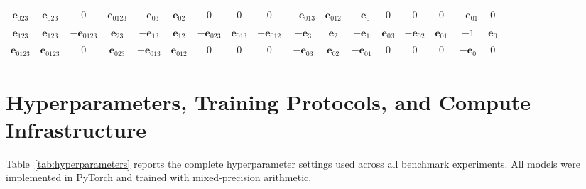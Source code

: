 \documentclass[10pt]{article}
\begin{document}
\begin{table}[!ht]
{\begin{tabular}{c|cccccccccccccccc}
$\mathbf{e}_{023}$ & $\mathbf{e}_{023}$ & $0$ & $\mathbf{e}_{0123}$ & $-\mathbf{e}_{03}$ & $\mathbf{e}_{02}$ & $0$ & $0$ & $0$ & $-\mathbf{e}_{013}$ & $\mathbf{e}_{012}$ & $-\mathbf{e}_0$ & $0$ & $0$ & $0$ & $-\mathbf{e}_{01}$ & $0$ \\
$\mathbf{e}_{123}$ & $\mathbf{e}_{123}$ & $-\mathbf{e}_{0123}$ & $\mathbf{e}_{23}$ & $-\mathbf{e}_{13}$ & $\mathbf{e}_{12}$ & $-\mathbf{e}_{023}$ & $\mathbf{e}_{013}$ & $-\mathbf{e}_{012}$ & $-\mathbf{e}_3$ & $\mathbf{e}_2$ & $-\mathbf{e}_1$ & $\mathbf{e}_{03}$ & $-\mathbf{e}_{02}$ & $\mathbf{e}_{01}$ & $-1$ & $\mathbf{e}_0$ \\
$\mathbf{e}_{0123}$ & $\mathbf{e}_{0123}$ & $0$ & $\mathbf{e}_{023}$ & $-\mathbf{e}_{013}$ & $\mathbf{e}_{012}$ & $0$ & $0$ & $0$ & $-\mathbf{e}_{03}$ & $\mathbf{e}_{02}$ & $-\mathbf{e}_{01}$ & $0$ & $0$ & $0$ & $-\mathbf{e}_0$ & $0$ \\
\bottomrule
\end{tabular}%
}
\end{table}

\section{Hyperparameters, Training Protocols, and Compute Infrastructure}
\label{app:training_details}
\label{app:hyperparameters}

Table~\ref{tab:hyperparameters} reports the complete hyperparameter settings used across all benchmark experiments. All models were implemented in PyTorch and trained with mixed-precision arithmetic.
\end{document}
